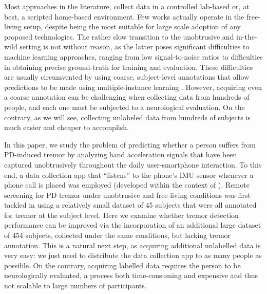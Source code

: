 \documentclass[journal,twoside,web]{ieeecolor}
\begin{document}
Most approaches in the literature, collect data in a controlled lab-based or, at
best, a scripted home-based environment. Few works actually operate in the
free-living setup, despite being the most suitable for large scale adoption of
any proposed technologies. The rather slow transition to the unobtrusive and
in-the-wild setting is not without reason, as the latter poses significant
difficulties to machine learning approaches, ranging from low signal-to-noise
ratios to difficulties in obtaining precise ground-truth for training and
evaluation. These difficulties are usually circumvented by using coarse,
subject-level annotations that allow predictions to be made using
multiple-instance learning  \cite{alpapado2019tremor, papadopoulos2019multiple,
alpapado2020pd, das2012detecting}. However, acquiring even a coarse annotation
can be challenging when collecting data from hundreds of people, and each one
must be subjected to a neurological evaluation. On the contrary, as we will
see, collecting unlabeled data from hundreds of subjects is much easier and
cheaper to accomplish. 

In this paper, we study the problem of predicting whether a person suffers from
PD-induced tremor by analyzing hand acceleration signals that
have been captured unobtrusively throughout  the daily user-smartphone
interaction. To this end, a data collection app that ``listens'' to the phone's
IMU sensor whenever a phone call is placed was employed (developed within the
context of \cite{lisa_klingelhoefer_2017_1199554}). 
Remote screening for PD tremor under
unobtrusive and free-living conditions was first tackled in
\cite{alpapado2019tremor} using a relatively small dataset of 45 subjects that
were all annotated for tremor at the subject level. Here we examine  
whether tremor detection performance can be
improved via the incorporation of an additional large dataset of 454 subjects,
collected under the same conditions, but lacking tremor annotation. This is a
natural next step, as acquiring additional unlabelled data is very easy: we just
need to  distribute the data collection app to as many people as possible. On
the contrary, acquiring labelled data requires the person to be
neurologically evaluated, a process both time-consuming and expensive
and thus not scalable to large numbers of participants.
\end{document}
